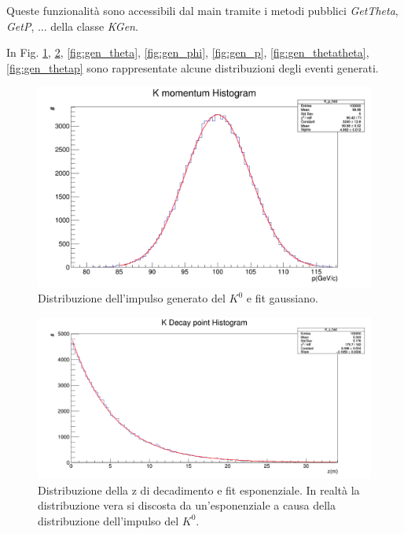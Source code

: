 \documentclass[8pt]{extarticle}
\begin{document}
Queste funzionalità sono accessibili dal main tramite i metodi pubblici \textit{GetTheta}, \textit{GetP}, ... della classe \textit{KGen}.

In Fig. \ref{fig:gen_pK}, \ref{fig:gen_z}, \ref{fig:gen_theta}, \ref{fig:gen_phi}, \ref{fig:gen_p}, \ref{fig:gen_thetatheta}, \ref{fig:gen_thetap} sono rappresentate alcune distribuzioni degli eventi generati.

\begin{figure}
	\begin{center}
		\includegraphics[scale=0.3]{gen_pK} 
		\caption{Distribuzione dell'impulso generato del $K^0$ e fit gaussiano.}
		\label{fig:gen_pK}
	\end{center}
\end{figure}

\begin{figure}
	\begin{center}
		\includegraphics[scale=0.3]{gen_z} 
		\caption{Distribuzione della z di decadimento e fit esponenziale. In realtà la distribuzione vera si discosta da un'esponenziale a causa della distribuzione dell'impulso del $K^0$.}
		\label{fig:gen_z}
	\end{center}
\end{figure}
\end{document}
